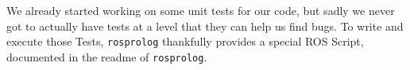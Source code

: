 \documentclass[main.tex]{subfiles}
\begin{document}
		We already started working on some unit tests for our code, but sadly we never got to actually have tests at a level that they can help us find bugs. To write and execute those Tests, \texttt{rosprolog} thankfully provides a special ROS Script, documented in the readme of \texttt{rosprolog}.


		
		
		
		
		
	\endgroup
\end{document}
